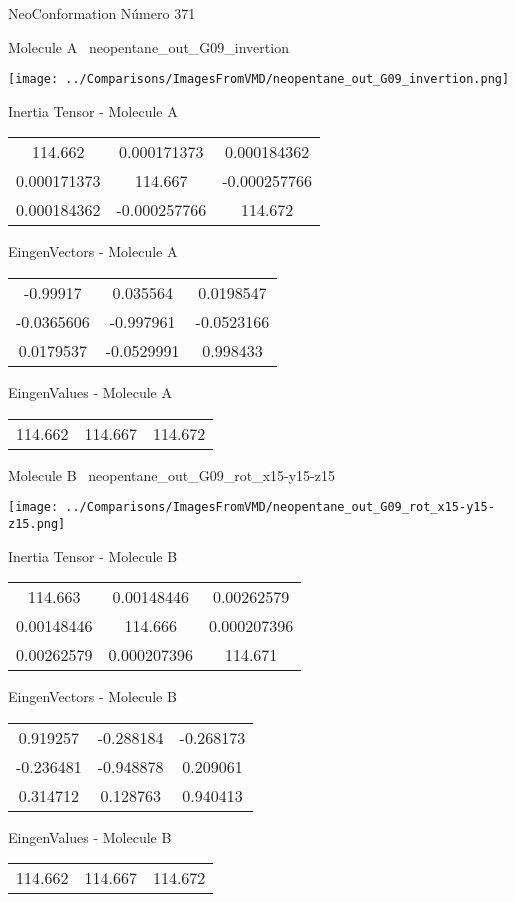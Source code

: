 \vtab[-3cm]
\begin{center}
{\large NeoConformation \tab Número 371}
\end{center}
\begin{multicols}{2}
\begin{center}

Molecule A \
neopentane\_out\_G09\_invertion

\texttt{[image: ../Comparisons/ImagesFromVMD/neopentane\_out\_G09\_invertion.png]}

Inertia Tensor - Molecule A \\
\begin{tabular}{|c c c|}
114.662	 & 	0.000171373	 & 	0.000184362	 \\
0.000171373	 & 	114.667	 & 	-0.000257766	 \\
0.000184362	 & 	-0.000257766	 & 	114.672
\end{tabular}

\vtab
 EingenVectors - Molecule A     \\
\begin{tabular}{|c c c|}
-0.99917	 & 	0.035564	 & 	0.0198547	 \\
-0.0365606	 & 	-0.997961	 & 	-0.0523166	 \\
0.0179537	 & 	-0.0529991	 & 	0.998433
\end{tabular}

\vtab
 EingenValues - Molecule A     \\
\begin{tabular}{|c c c|}
114.662	 & 	114.667	 & 	114.672	 \\
\end{tabular}
\columnbreak

Molecule B \
neopentane\_out\_G09\_rot\_x15-y15-z15

\texttt{[image: ../Comparisons/ImagesFromVMD/neopentane\_out\_G09\_rot\_x15-y15-z15.png]}

Inertia Tensor - Molecule B \\
\begin{tabular}{|c c c|}
114.663	 & 	0.00148446	 & 	0.00262579	 \\
0.00148446	 & 	114.666	 & 	0.000207396	 \\
0.00262579	 & 	0.000207396	 & 	114.671
\end{tabular}

\vtab
 EingenVectors - Molecule B     \\
\begin{tabular}{|c c c|}
0.919257	 & 	-0.288184	 & 	-0.268173	 \\
-0.236481	 & 	-0.948878	 & 	0.209061	 \\
0.314712	 & 	0.128763	 & 	0.940413
\end{tabular}

\vtab
 EingenValues - Molecule B     \\
\begin{tabular}{|c c c|}
114.662	 & 	114.667	 & 	114.672	 \\
\end{tabular}

\end{center}
\end{multicols}

